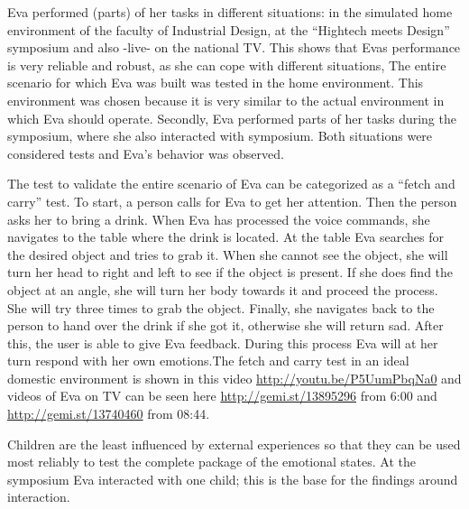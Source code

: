 \documentclass[project_eva.tex]{subfiles}
\begin{document}
Eva performed  (parts) of her tasks in different situations: in the simulated home environment of the faculty of Industrial Design, at the ``Hightech meets Design''  symposium and also -live- on the national TV. This shows that Eva\textquotesingle s performance is very reliable and robust, as she can cope with different situations, The entire scenario for which Eva was built was tested in the home environment. This environment was chosen because it is very similar to the actual environment in which Eva should operate. Secondly, Eva performed parts of her tasks during the symposium, where she also interacted with symposium. Both situations were considered tests and Eva's behavior was observed.

The test to validate the entire scenario of Eva can be categorized as a ``fetch and carry'' test. To start, a person calls for Eva to get her attention. Then the person asks her to bring a drink. When Eva has processed the voice commands, she navigates to the table where the drink is located. At the table Eva searches for the desired object and tries to grab it. When she cannot see the object, she will turn her head to right and left to see if the object is present. If she does find the object at an angle, she will turn her body towards it and proceed the process. She will try three times to grab the object. Finally, she navigates back to the person to hand over the drink if she got it, otherwise she will return sad. After this, the user is able to give Eva feedback. During this process Eva will at her turn respond with her own emotions.The fetch and carry test in an ideal domestic environment is shown in this video \url{http://youtu.be/P5UumPbqNa0} and videos of Eva on TV can be seen here \url{http://gemi.st/13895296} from 6:00 and \url{http://gemi.st/13740460}
from 08:44.

Children are the least influenced by external experiences so that they can be used most reliably to test the complete package of the emotional states.  At the symposium Eva interacted with one child; this is the base for the findings around interaction.
 
\end{document}
